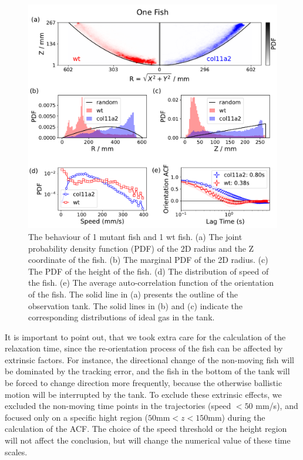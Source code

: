 \documentclass[11pt,twoside]{report}
\begin{document}
\begin{figure}
  \includegraphics[width=\linewidth]{behaviour-1}
  \caption[The behaviour of one mutant fish and one wildtype fish]{
  	The behaviour of 1 mutant fish and 1 wt fish.
  	(a) The joint probability density function (PDF) of the 2D radius and the Z coordinate of the fish.
  	(b) The marginal PDF of the 2D radius. 
  	(c) The PDF of the height of the fish.
  	(d) The distribution of speed of the fish.
  	(e) The average auto-correlation function of the orientation of the fish.
  	The solid line in (a) presents the outline of the observation tank. The solid lines in (b) and (c) indicate the corresponding distributions of ideal gas in the tank.
  }
\label{fig:mutant-1}
\end{figure}



It is important to point out, that we took extra care for the calculation of the relaxation time, since the re-orientation process of the fish can be affected by extrinsic factors.
For instance, the directional change of the non-moving fish will be dominated by the tracking error, and the fish in the bottom of the tank will be forced to change direction more frequently, because the otherwise ballistic motion will be interrupted by the tank.
To exclude these extrinsic effects, we excluded the non-moving time points in the trajectories (speed $< 50$ mm/s), and focused only on a specific hight region ($50 \mathrm{mm} < z < 150 \mathrm{mm}$) during the calculation of the ACF\@.
The choice of the speed threshold or the height region will not affect the conclusion, but will change the numerical value of these time scales.
\end{document}
